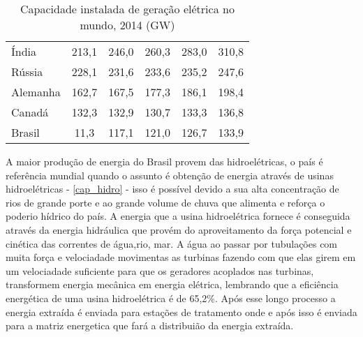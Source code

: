\begin{table}[!ht]
\begin{tabular}{lccccc}
		Índia                                        & 213,1                                & 246,0                                & 260,3                                & 283,0                                & 310,8                                                                            \\
		\rowcolor[HTML]{DDDDDD} 
		Rússia                                       & 228,1                                & 231,6                                & 233,6                                & 235,2                                & 247,6                                                                            \\
		Alemanha                                     & 162,7                                & 167,5                                & 177,3                                & 186,1                                & 198,4                                                                            \\
		\rowcolor[HTML]{DDDDDD} 
		Canadá                                       & 132,3                                & 132,9                                & 130,7                                & 133,3                                & 136,8                                                                            \\
		Brasil                                       & 11,3                                 & 117,1                                & 121,0                                & 126,7                                & 133,9                                                                           
	\end{tabular}
	\caption{Capacidade instalada de geração elétrica no mundo, 2014 (GW)}
	\label{cap_ele}
\end{table}

A maior produção de energia do Brasil provem das hidroelétricas, o país é referência mundial quando o assunto é obtenção de energia através de
usinas hidroelétricas - \autoref{cap_hidro} - isso é possível devido a sua alta concentração de rios de grande porte e ao grande volume de chuva
que alimenta e reforça o poderio hídrico do país. A energia que a usina hidroelétrica fornece é conseguida através da energia hidráulica que provém
do aproveitamento da força potencial e cinética das correntes de água,rio, mar. A água ao passar por tubulações com muita força e velociadade 
movimentas as turbinas fazendo com que elas girem em um velociadade suficiente para que os geradores acoplados nas turbinas, transformem energia
mecânica em energia elétrica, lembrando que a eficiência energética de uma usina hidroelétrica é de 65,2\%. Após esse longo processo a energia 
extraída é enviada para estações de tratamento onde e após isso é enviada para a matriz energetica que fará a distribuião da energia extraída. 

